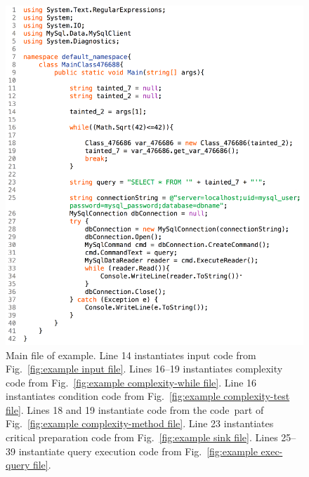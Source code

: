 \documentclass[12pt]{article}
\begin{document}
\begin{figure}[htbp]
  \includegraphics[width=\linewidth]{fig_example_code1.png}
  \caption{Main file of example. Line 14 instantiates input code from 
    Fig.~\ref{fig:example input file}. Lines 16--19 instantiates complexity code from 
    Fig.~\ref{fig:example complexity-while file}. Line 16 instantiates condition code from
    Fig.~\ref{fig:example complexity-test file}.  Lines 18 and 19 instantiate code from the
    \texlangle code\texrangle\ part of Fig.~\ref{fig:example complexity-method file}.
    Line 23 instantiates critical preparation code from Fig.~\ref{fig:example sink file}.
    Lines 25--39 instantiate query execution code from Fig.~\ref{fig:example exec-query file}.}
  \label{fig:example main file}
\end{figure}
\end{document}
